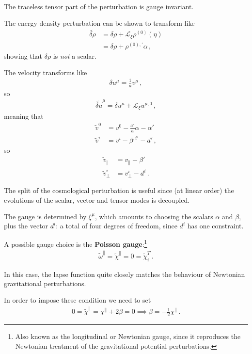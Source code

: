 \documentclass[main.tex]{subfiles}
\begin{document}
The traceless tensor part of the perturbation is gauge invariant. 

The energy density perturbation can be shown to transform like 
%
\begin{align}
\widetilde{\delta \rho } &= \delta \rho + \mathscr{L}_\xi \rho^{(0)} (\eta ) \\ 
&= \delta \rho + \rho^{(0), \prime} \alpha 
\,,
\end{align}
%
showing that \(\delta \rho \) is \emph{not} a scalar.
 
The velocity transforms like 
%
\begin{align}
\delta u^{\mu } = \frac{1}{a} v^{\mu } 
\,,
\end{align}
%
so 
%
\begin{align}
\widetilde{\delta u}^{\mu } = \delta u^{\mu } + \mathscr{L}_\xi u^{\mu , 0}
\,,
\end{align}
%
meaning that 
%
\begin{align}
\widetilde{v}^{0} &= v^{0} - \frac{a'}{a} \alpha - \alpha '  \\
\widetilde{v}^{i} &= v^{i} - \beta^{, i\prime} - d '
\,,
\end{align}
%
so 
%
\begin{align}
\widetilde{v}_\parallel &= v_\parallel - \beta '  \\
\widetilde{v}^{i}_{\perp} &= v^{i}_\perp - d^i
\,.
\end{align}

The split of the cosmological perturbation is useful since (at linear order) the evolutions of the scalar, vector and tensor modes is decoupled.

The gauge is determined by \(\xi^{\mu }\), which amounts to choosing the scalars \(\alpha \) and \(\beta \), plus the vector \(d^{i} \): a total of four degrees of freedom, since \(d^{i} \) has one constraint. 

A possible gauge choice is the \textbf{Poisson gauge}:\footnote{Also known as the longitudinal or Newtonian gauge, since it reproduces the Newtonian treatment of the gravitational potential perturbations.}
%
\begin{align}
\widetilde{\omega}^{\parallel} = \widetilde{\chi}^{\parallel} = 0 = \widetilde{\chi}^{T}_i 
\,.
\end{align}

In this case, the lapse function quite closely matches the behaviour of Newtonian gravitational perturbations. 

In order to impose these condition we need to set
%
\begin{align}
0 = \widetilde{\chi}^{\parallel} = \chi^{\parallel} + 2 \beta = 0 \implies \beta = - \frac{1}{2} \chi^{\parallel}
\,.
\end{align}
%
\end{document}
